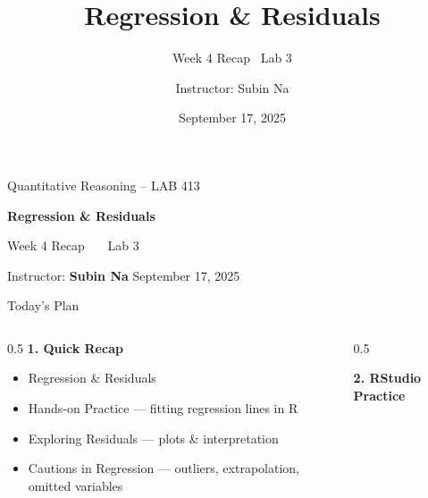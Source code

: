 \documentclass[aspectratio=169,11pt]{beamer}
\title{\bfseries Regression \& Residuals}
\subtitle{Week 4 Recap \textbullet\ Lab 3}
\author{Instructor: Subin Na}
\institute{Quantitative Reasoning -- LAB 413}
\date{September 17, 2025}
\begin{document}
{
\begin{frame}
  \vfill
  {\color{qrgray}\small Quantitative Reasoning -- LAB 413}\\[0.6em]
  {\color{qrnavy}\huge\bfseries Regression \& Residuals\par}
  \vspace{0.4em}
  {\color{qrblue}\large Week 4 Recap \ \textbullet\ \ Lab 3}\par
  \vspace{1.6em}
  {\color{qrgray} Instructor: \textbf{Subin Na} \hfill September 17, 2025}
  \vfill
\end{frame}
}

\begin{frame}{Today's Plan}
  \begin{columns}[T]
    \begin{column}{0.5\textwidth}
      \textbf{\color{qrnavy}1. Quick Recap}
      \begin{itemize}
        \item Regression \& Residuals
        \item Hands-on Practice --- fitting regression lines in R
        \item Exploring Residuals --- plots \& interpretation
        \item Cautions in Regression --- outliers, extrapolation, omitted variables
      \end{itemize}
    \end{column}
    \begin{column}{0.5\textwidth}
      \vspace{2.2em}

      \textbf{\color{qrnavy}2. RStudio Practice}
    \end{column}
  \end{columns}
\end{frame}
\end{document}
